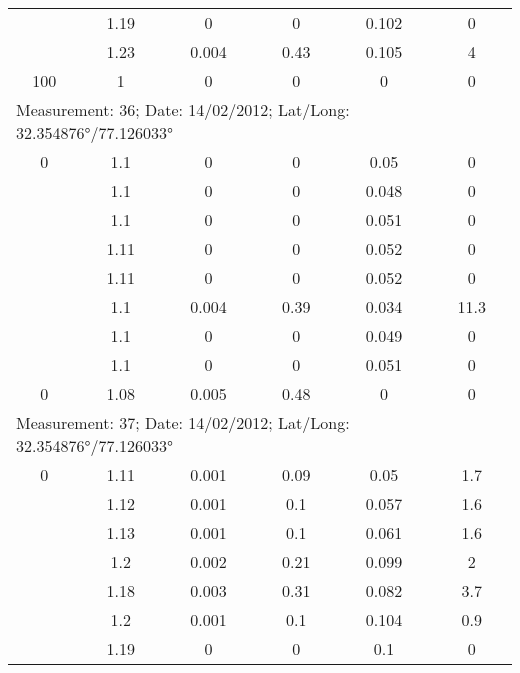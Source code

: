 \begin{longtable}{cccccc}
		& 1.19  & 0     & 0     & 0.102 & 0 \\
		
		& 1.23  & 0.004 & 0.43  & 0.105 & 4 \\
		
		100   & 1     & 0     & 0     & 0     & 0 \\
		\midrule
		\multicolumn{6}{l}{Measurement: 36; Date: 14/02/2012;
			Lat/Long: 32.354876°/77.126033°} \\		
		\midrule
		0     & 1.1   & 0     & 0     & 0.05  & 0 \\
		
		& 1.1   & 0     & 0     & 0.048 & 0 \\
		
		& 1.1   & 0     & 0     & 0.051 & 0 \\
		
		& 1.11  & 0     & 0     & 0.052 & 0 \\
		
		& 1.11  & 0     & 0     & 0.052 & 0 \\
		
		& 1.1   & 0.004 & 0.39  & 0.034 & 11.3 \\
		
		& 1.1   & 0     & 0     & 0.049 & 0 \\
		
		& 1.1   & 0     & 0     & 0.051 & 0 \\
		
		0     & 1.08  & 0.005 & 0.48  & 0     & 0 \\
		\midrule
		\multicolumn{6}{l}{Measurement: 37; Date: 14/02/2012;
			Lat/Long: 32.354876°/77.126033°} \\		
		\midrule
		0     & 1.11  & 0.001 & 0.09  & 0.05  & 1.7 \\
		
		& 1.12  & 0.001 & 0.1   & 0.057 & 1.6 \\
		
		& 1.13  & 0.001 & 0.1   & 0.061 & 1.6 \\
		
		& 1.2   & 0.002 & 0.21  & 0.099 & 2 \\
		
		& 1.18  & 0.003 & 0.31  & 0.082 & 3.7 \\
		
		& 1.2   & 0.001 & 0.1   & 0.104 & 0.9 \\
		
		& 1.19  & 0     & 0     & 0.1   & 0 \\
		

\end{longtable}
